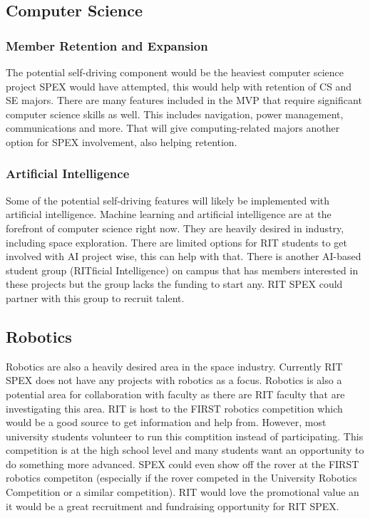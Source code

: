 \documentclass[conference]{IEEEtran} %
\begin{document}
\subsection{Computer Science}
\label{subsec:cs}
\subsubsection{Member Retention and Expansion}
\label{subsubsec:cs}
The potential self-driving component would be the heaviest computer science project SPEX would have attempted, this would help with retention of CS and SE majors. 
There are many features included in the MVP that require significant computer science skills as well.
This includes navigation, power management, communications and more.
That will give computing-related majors another option for SPEX involvement, also helping retention.

\subsubsection{Artificial Intelligence}
\label{subsubsec:ai}
Some of the potential self-driving features will likely be implemented with artificial intelligence.
Machine learning and artificial intelligence are at the forefront of computer science right now. 
They are heavily desired in industry, including space exploration.
There are limited options for RIT students to get involved with AI project wise, this can help with that. 
There is another AI-based student group (RITficial Intelligence) on campus that has members interested in these projects but the group lacks the funding to start any.
RIT SPEX could partner with this group to recruit talent.

\subsection{Robotics}
\label{subsec:robotics}
Robotics are also a heavily desired area in the space industry. 
Currently RIT SPEX does not have any projects with robotics as a focus. 
Robotics is also a potential area for collaboration with faculty as there are RIT faculty that are investigating this area.
RIT is host to the FIRST robotics competition which would be a good source to get information and help from. 
However, most university students volunteer to run this comptition instead of participating. 
This competition is at the high school level and many students want an opportunity to do something more advanced. 
SPEX could even show off the rover at the FIRST robotics competiton (especially if the rover competed in the University Robotics Competition or a similar competition). 
RIT would love the promotional value an it would be a great recruitment and fundraising opportunity for RIT SPEX.
\end{document}
